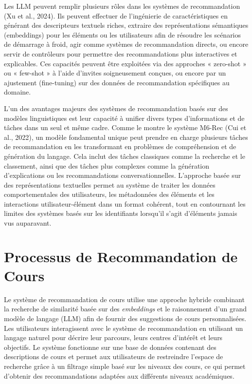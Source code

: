 Les LLM peuvent remplir plusieurs rôles dans les systèmes de recommandation (Xu et al., 2024). Ils peuvent effectuer de l’ingénierie de caractéristiques en générant des descripteurs textuels riches, extraire des représentations sémantiques (embeddings) pour les éléments ou les utilisateurs afin de résoudre les scénarios de démarrage à froid, agir comme systèmes de recommandation directs, ou encore servir de contrôleurs pour permettre des recommandations plus interactives et explicables. Ces capacités peuvent être exploitées via des approches « zero-shot » ou « few-shot » à l’aide d’invites soigneusement conçues, ou encore par un ajustement (fine-tuning) sur des données de recommandation spécifiques au domaine.

L’un des avantages majeurs des systèmes de recommandation basés sur des modèles linguistiques est leur capacité à unifier divers types d’informations et de tâches dans un seul et même cadre. Comme le montre le système M6-Rec (Cui et al., 2022), un modèle fondamental unique peut prendre en charge plusieurs tâches de recommandation en les transformant en problèmes de compréhension et de génération du langage. Cela inclut des tâches classiques comme la recherche et le classement, ainsi que des tâches plus complexes comme la génération d’explications ou les recommandations conversationnelles. L’approche basée sur des représentations textuelles permet au système de traiter les données comportementales des utilisateurs, les métadonnées des éléments et les interactions utilisateur-élément dans un format cohérent, tout en contournant les limites des systèmes basés sur les identifiants lorsqu’il s’agit d’éléments jamais vus auparavant.

\section{Processus de Recommandation de Cours}
\paragraph{} 
Le système de recommandation de cours utilise une approche hybride combinant la recherche de similarité basée sur des \textit{embeddings} et le raisonnement d’un grand modèle de langage (LLM) afin de fournir des suggestions de cours personnalisées. Les utilisateurs interagissent avec le système de recommandation en utilisant un langage naturel pour décrire leur parcours, leurs centres d’intérêt et leurs objectifs. Le système fonctionne sur une base de données contenant des descriptions de cours et permet aux utilisateurs de restreindre l’espace de recherche grâce à un filtrage simple basé sur les niveaux des cours, ce qui permet d’obtenir des recommandations adaptées aux différents niveaux académiques.

